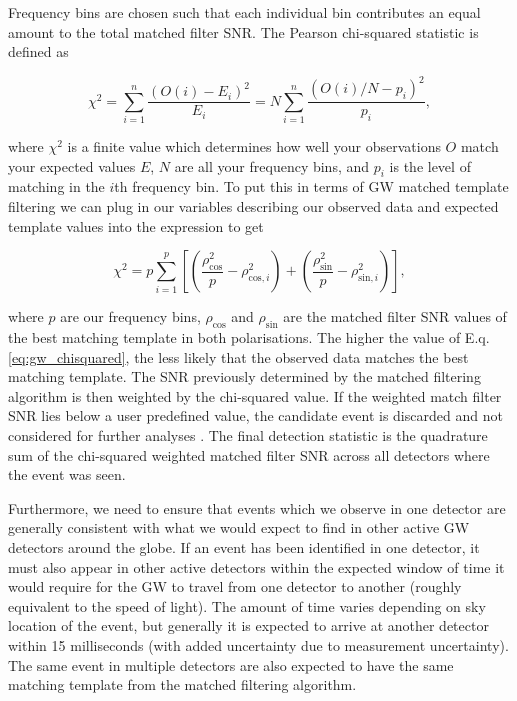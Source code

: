 Frequency bins are chosen such that each individual bin contributes an equal amount to the total matched filter \ac{SNR}. The Pearson chi-squared statistic is defined as 

\begin{equation}
    \chi^2 = \sum_{i=1}^{n} \frac{(O(i) - E_i)^2}{E_i} 
    = N \sum_{i=1}^{n} \frac{(O(i)/N - p_i)^2}{p_i},
\end{equation}

%
%
where $\chi^2$ is a finite value which determines how well your observations $O$ match your expected values $E$, $N$ are all your frequency bins, and $p_i$ is the level of matching in the $i$th frequency bin. To put this in terms of \ac{GW} matched template filtering we can plug in our variables describing our observed data and expected template values into the expression to get 

\begin{equation} \label{eq:gw_chisquared}
    \chi^2 = p \sum_{i=1}^p \left[  \left( \frac{\rho_{\mathrm{cos}}^2 }{p} - \rho_{\mathrm{cos}, i}^2 \right) 
    + \left( \frac{\rho_{\mathrm{sin}}^2 }{p} - \rho_{\mathrm{sin}, i}^2 \right) \right],
\end{equation}

where $p$ are our frequency bins, $\rho_{\mathrm{cos}}$ and $\rho_{\mathrm{sin}}$ are the matched filter \ac{SNR} values of the best matching template in both polarisations. The higher the value of E.q. \ref{eq:gw_chisquared}, the less likely that the observed data matches the best matching template. The \ac{SNR} previously determined by the matched filtering algorithm is then weighted by the chi-squared value. If the weighted match filter \ac{SNR} lies below a user predefined value, the candidate event is discarded and not considered for further analyses \cite{0264-9381-33-21-215004}. The final detection statistic is the quadrature sum of the chi-squared weighted matched filter \ac{SNR} across all detectors where the event was seen.

%
%
Furthermore, we need to ensure that events which we observe in one detector are generally consistent with what we would expect to find in other active \ac{GW} detectors around the globe. If an event has been identified in one detector, it must also appear in other active detectors within the expected window of time it would require for the \ac{GW} to travel from one detector to another (roughly equivalent to the speed of light). The amount of time varies depending on sky location of the event, but generally it is expected to arrive at another detector within 15 milliseconds (with added uncertainty due to measurement uncertainty). The same event in multiple detectors are also expected to have the same matching template from the matched filtering algorithm.

